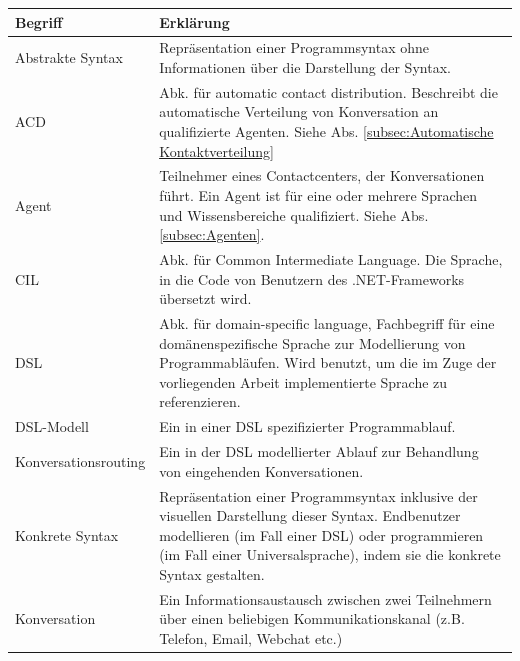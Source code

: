 \begin{table}[hbtp]
\centering
\settowidth{}
\begin{tabulary}{1.0\textwidth}{L|L}
\textbf{Begriff} & \textbf{Erklärung} \\
\hline
Abstrakte Syntax & Repräsentation einer Programmsyntax ohne Informationen über die Darstellung der Syntax.\\

\hline

ACD & Abk. für automatic contact distribution. Beschreibt die automatische Verteilung von Konversation an qualifizierte Agenten. Siehe Abs. \ref{subsec:Automatische Kontaktverteilung} \\

\hline

Agent & Teilnehmer eines Contactcenters, der Konversationen führt. Ein Agent ist für eine oder mehrere Sprachen und Wissensbereiche qualifiziert. Siehe Abs. \ref{subsec:Agenten}. \\

\hline

CIL & Abk. für Common Intermediate Language. Die Sprache, in die Code von Benutzern des .NET-Frameworks übersetzt wird. \\

\hline

DSL & Abk. für domain-specific language, Fachbegriff für eine domänenspezifische Sprache zur Modellierung von Programmabläufen. Wird benutzt, um die im Zuge der vorliegenden Arbeit implementierte Sprache zu referenzieren.\\

\hline

DSL-Modell & Ein in einer DSL spezifizierter Programmablauf.\\

\hline
    
Konversationsrouting & Ein in der DSL modellierter Ablauf zur Behandlung von eingehenden Konversationen.\\

\hline

Konkrete Syntax & Repräsentation einer Programmsyntax inklusive der visuellen Darstellung dieser Syntax. Endbenutzer modellieren (im Fall einer DSL) oder programmieren (im Fall einer Universalsprache), indem sie die konkrete Syntax gestalten.\\

\hline

Konversation & Ein Informationsaustausch zwischen zwei Teilnehmern über einen beliebigen Kommunikationskanal (z.B. Telefon, Email, Webchat etc.)\\


\end{tabulary}
\end{table}
